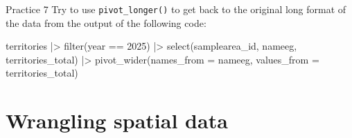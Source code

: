 \documentclass[
  ignorenonframetext,
  aspectratio=169,
]{beamer}
\newenvironment{Shaded}{\begin{snugshade}}{\end{snugshade}}
\newcommand{\AttributeTok}[1]{\textcolor[rgb]{0.40,0.45,0.13}{#1}}
\newcommand{\DecValTok}[1]{\textcolor[rgb]{0.68,0.00,0.00}{#1}}
\newcommand{\FunctionTok}[1]{\textcolor[rgb]{0.28,0.35,0.67}{#1}}
\newcommand{\NormalTok}[1]{\textcolor[rgb]{0.00,0.23,0.31}{#1}}
\newcommand{\SpecialCharTok}[1]{\textcolor[rgb]{0.37,0.37,0.37}{#1}}
\let\oldtexttt\texttt
\renewcommand{\texttt}[1]{\colorbox{gray!20}{\oldtexttt{#1}}}
\begin{document}
\begin{frame}[fragile]{Practice 7}
\protect{}\label{practice-7}
Try to use \texttt{pivot\_longer()} to get back to the original long
format of the data from the output of the following code:

\footnotesize

\begin{Shaded}
\begin{Highlighting}[]
\NormalTok{territories }\SpecialCharTok{|\textgreater{}} 
    \FunctionTok{filter}\NormalTok{(year }\SpecialCharTok{==} \DecValTok{2025}\NormalTok{) }\SpecialCharTok{|\textgreater{}} 
    \FunctionTok{select}\NormalTok{(samplearea\_id, nameeg, territories\_total) }\SpecialCharTok{|\textgreater{}} 
    \FunctionTok{pivot\_wider}\NormalTok{(}\AttributeTok{names\_from =}\NormalTok{ nameeg, }
                \AttributeTok{values\_from =}\NormalTok{ territories\_total)}
\end{Highlighting}
\end{Shaded}

\normalsize
\end{frame}

\section{Wrangling spatial data}\label{wrangling-spatial-data}
\end{document}
